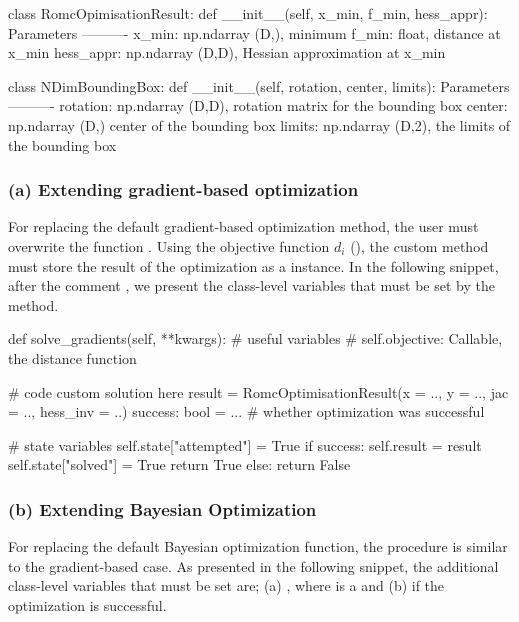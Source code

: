 \documentclass[article]{jss}
\begin{document}
\begin{Code}
class RomcOpimisationResult:
    def __init__(self, x_min, f_min, hess_appr):
        Parameters
        ----------
        x_min: np.ndarray (D,), minimum
        f_min: float, distance at x_min
        hess_appr: np.ndarray (D,D), Hessian approximation at x_min

class NDimBoundingBox:
    def __init__(self, rotation, center, limits):
        Parameters
        ----------
        rotation: np.ndarray (D,D), rotation matrix for the bounding box
        center: np.ndarray (D,) center of the bounding box
        limits: np.ndarray (D,2), the limits of the bounding box
\end{Code}

\subsubsection*{(a) Extending gradient-based optimization}

For replacing the default gradient-based optimization method, the user
must overwrite the function . Using the
objective function \(d_i\) (), the custom method
must store the result of the optimization as a
 instance. In the following snippet,
after the comment , we present the
class-level variables that must be set by the method.

\begin{Code}
def solve_gradients(self, **kwargs):
    # useful variables
    # self.objective: Callable, the distance function

    # code custom solution here
    result = RomcOptimisationResult(x = .., y = .., jac = .., hess_inv = ..)
    success: bool = ... # whether optimization was successful

    # state variables
    self.state["attempted"] = True
    if success:
        self.result = result
        self.state["solved"] = True
        return True
    else:
        return False
\end{Code}

\subsubsection*{(b) Extending Bayesian Optimization}

For replacing the default Bayesian optimization function, the
procedure is similar to the gradient-based case. As presented in the
following snippet, the additional class-level variables that must be
set are; (a) , where
 is a  and (b)
 if the optimization is
successful.
\end{document}
